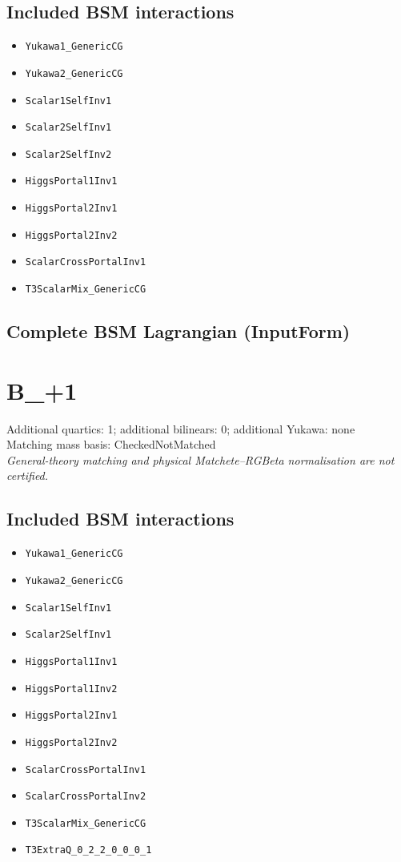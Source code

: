 \documentclass[10pt,a4paper]{article}
\begin{document}
\subsection*{Included BSM interactions}
\begin{itemize}
\item \texttt{Yukawa1\_GenericCG}
\item \texttt{Yukawa2\_GenericCG}
\item \texttt{Scalar1SelfInv1}
\item \texttt{Scalar2SelfInv1}
\item \texttt{Scalar2SelfInv2}
\item \texttt{HiggsPortal1Inv1}
\item \texttt{HiggsPortal2Inv1}
\item \texttt{HiggsPortal2Inv2}
\item \texttt{ScalarCrossPortalInv1}
\item \texttt{T3ScalarMix\_GenericCG}
\end{itemize}
\subsection*{Complete BSM Lagrangian (InputForm)}

\clearpage
\section{B\_+1}
Additional quartics: 1; additional bilinears: 0; additional Yukawa: none\\
Matching mass basis: CheckedNotMatched\\
\emph{General-theory matching and physical Matchete--RGBeta normalisation are not certified.}
\subsection*{Included BSM interactions}
\begin{itemize}
\item \texttt{Yukawa1\_GenericCG}
\item \texttt{Yukawa2\_GenericCG}
\item \texttt{Scalar1SelfInv1}
\item \texttt{Scalar2SelfInv1}
\item \texttt{HiggsPortal1Inv1}
\item \texttt{HiggsPortal1Inv2}
\item \texttt{HiggsPortal2Inv1}
\item \texttt{HiggsPortal2Inv2}
\item \texttt{ScalarCrossPortalInv1}
\item \texttt{ScalarCrossPortalInv2}
\item \texttt{T3ScalarMix\_GenericCG}
\item \texttt{T3ExtraQ\_0\_2\_2\_0\_0\_0\_1}
\end{itemize}
\end{document}
